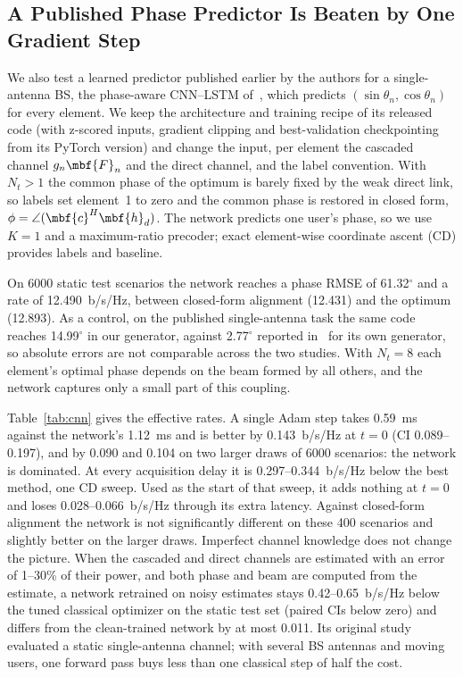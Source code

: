 \subsection{A Published Phase Predictor Is Beaten by One Gradient Step}
\label{sec:res_cnn}
We also test a learned predictor published earlier by the authors for a single-antenna BS, the phase-aware CNN--LSTM of~\cite{SavasciSen2026AISY}, which predicts $(\sin\theta_n,\cos\theta_n)$ for every element. We keep the architecture and training recipe of its released code (with z-scored inputs, gradient clipping and best-validation checkpointing from its PyTorch version) and change the input, per element the cascaded channel $g_n\mbf{F}_n$ and the direct channel, and the label convention. With $N_t>1$ the common phase of the optimum is barely fixed by the weak direct link, so labels set element~1 to zero and the common phase is restored in closed form, $\phi=\angle(\mbf{c}^H\mbf{h}_d)$. The network predicts one user's phase, so we use $K=1$ and a maximum-ratio precoder; exact element-wise coordinate ascent (CD) provides labels and baseline.

On 6000 static test scenarios the network reaches a phase RMSE of 61.32$^\circ$ and a rate of 12.490~b/s/Hz, between closed-form alignment (12.431) and the optimum (12.893). As a control, on the published single-antenna task the same code reaches 14.99$^\circ$ in our generator, against 2.77$^\circ$ reported in~\cite{SavasciSen2026AISY} for its own generator, so absolute errors are not comparable across the two studies. With $N_t=8$ each element's optimal phase depends on the beam formed by all others, and the network captures only a small part of this coupling.

Table~\ref{tab:cnn} gives the effective rates. A single Adam step takes 0.59~ms against the network's 1.12~ms and is better by 0.143~b/s/Hz at $t=0$ (CI 0.089--0.197), and by 0.090 and 0.104 on two larger draws of 6000 scenarios: the network is dominated. At every acquisition delay it is 0.297--0.344~b/s/Hz below the best method, one CD sweep. Used as the start of that sweep, it adds nothing at $t=0$ and loses 0.028--0.066~b/s/Hz through its extra latency. Against closed-form alignment the network is not significantly different on these 400 scenarios and slightly better on the larger draws. Imperfect channel knowledge does not change the picture. When the cascaded and direct channels are estimated with an error of 1--30\% of their power, and both phase and beam are computed from the estimate, a network retrained on noisy estimates stays 0.42--0.65~b/s/Hz below the tuned classical optimizer on the static test set (paired CIs below zero) and differs from the clean-trained network by at most 0.011. Its original study~\cite{SavasciSen2026AISY} evaluated a static single-antenna channel; with several BS antennas and moving users, one forward pass buys less than one classical step of half the cost.

